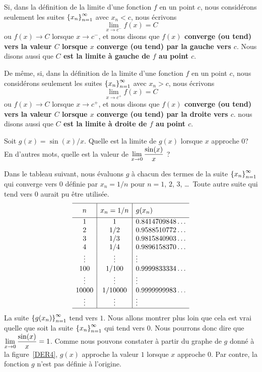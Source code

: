 {\begin{defn}
Si, dans la définition de la limite d'une fonction $f$ en un point
$c$, nous considérons seulement les suites
$\displaystyle \left\{x_n\right\}_{n=1}^\infty$ avec {\em $x_n < c$}, nous
écrivons
\[
\lim_{x\rightarrow c^-} f(x) = C
\]
ou $f(x) \to C$ lorsque $x \to c^-$,
et nous disons que {\bfseries $f(x)$ converge (ou tend) vers la valeur $C$
lorsque $x$ converge (ou tend) par la gauche vers $c$}.  Nous disons aussi
que {\bfseries $C$ est la limite à gauche de $f$ au point $c$}.

De même, si, dans la définition de la limite d'une fonction $f$ en un
point $c$, nous considérons seulement les suites
$\displaystyle \left\{x_n\right\}_{n=1}^\infty$ avec {\em $x_n > c$}, nous
écrivons
\[
\lim_{x\rightarrow c^+} f(x) = C
\]
ou $f(x) \to C$ lorsque $x \to c^+$,
et nous disons que {\bfseries $f(x)$ converge (ou tend) vers la valeur $C$
lorsque $x$ converge (ou tend) par la droite vers $c$}.  nous disons aussi que
{\bfseries $C$ est la limite à droite de $f$ au point $c$}.
\end{defn}

\begin{egg}
Soit $g(x) = \sin(x)/x$. Quelle est la limite de $g(x)$ lorsque $x$
approche $0$?  En d'autres mots, quelle est la valeur de
$\displaystyle \lim_{x\rightarrow 0} \frac{\sin(x)}{x}$ ?

Dans le tableau suivant, nous évaluons $g$ à chacun des
termes de la suite $\displaystyle \left\{x_n\right\}_{n=1}^\infty$ qui
converge vers $0$ définie par $x_n = 1/n$ pour $n=1$, $2$, $3$,
\ldots\  Toute autre suite qui tend vers $0$ aurait pu être utilisée.
\[
\begin{array}{c|c|l}
\hline
\rule[-0.7em]{0ex}{2em} n & x_n = 1/n & g(x_n) \\
\hline
1 & 1 & 0.8414709848\ldots \\
2 & 1/2 & 0.9588510772\ldots \\
3 & 1/3 & 0.9815840903\ldots \\
4 & 1/4 & 0.9896158370\ldots \\
\vdots & \vdots & \vdots \\
100 & 1/100 & 0.9999833334\ldots \\
\vdots & \vdots & \vdots \\
10000 & 1/10000 & 0.9999999983\ldots \\
\vdots & \vdots & \vdots \\
\hline
\end{array}
\]
La suite $\displaystyle \left\{g(x_n)\right\}_{n=1}^\infty$
tend vers $1$.  Nous allons montrer plus loin que cela est vrai quelle que
soit la suite $\displaystyle \left\{x_n\right\}_{n=1}^\infty$ qui tend
vers $0$.  Nous pourrons donc dire que
$\displaystyle \lim_{x\rightarrow 0} \frac{\sin(x)}{x} = 1$.
Comme nous pouvons constater à partir du graphe de $g$ donné à la
figure~\ref{DER4}, $g(x)$ approche la valeur $1$ lorsque $x$ approche
$0$.  Par contre, la fonction $g$ n'est pas définie à l'origine.
\label{E_SINXX}
\end{egg}

}
